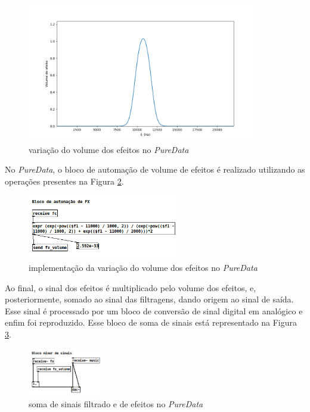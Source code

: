     \begin{figure}[h]
        \centering
        \includegraphics[width=0.9\textwidth]{figuras/fig49.png}
        \caption{variação do volume dos efeitos no \textit{PureData}}
        \label{fig49}
    \end{figure}

    No \textit{PureData}, o bloco de automação de volume de efeitos é realizado utilizando as operações presentes na Figura \ref{fig50}.

    \begin{figure}[h]
        \centering
        \includegraphics[width=0.6\textwidth]{figuras/fig50.png}
        \caption{implementação da variação do volume dos efeitos no \textit{PureData}}
        \label{fig50}
    \end{figure}

    Ao final, o sinal dos efeitos é multiplicado pelo volume dos efeitos, e, posteriormente, somado ao sinal das filtragens, dando origem ao sinal de saída. Esse sinal é processado por um bloco de conversão de sinal digital em analógico e enfim foi reproduzido. Esse bloco de soma de sinais está representado na Figura \ref{fig51}.

    \begin{figure}[h]
        \centering
        \includegraphics[width=0.3\textwidth]{figuras/fig51.png}
        \caption{soma de sinais filtrado e de efeitos no \textit{PureData}}
        \label{fig51}
    \end{figure}

